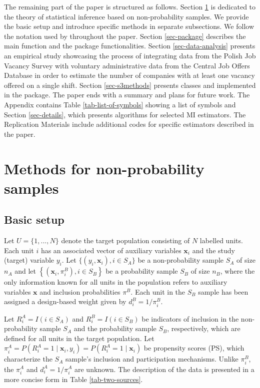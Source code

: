 \documentclass[
]{jss}
\begin{document}
The remaining part of the paper is structured as follows. Section
\ref{sec-methods} is dedicated to the theory of statistical inference
based on non-probability samples. We provide the basic setup and
introduce specific methods in separate subsections. We follow the
notation used by \citet{wu2022statistical} throughout the paper. Section
\ref{sec-package} describes the main function and the package
functionalities. Section \ref{sec-data-analysis} presents an empirical
study showcasing the process of integrating data from the Polish Job
Vacancy Survey with voluntary administrative data from the Central Job
Offers Database in order to estimate the number of companies with at
least one vacancy offered on a single shift. Section \ref{sec-s3methods}
presents classes and  implemented in the package. The
paper ends with a summary and plans for future work. The Appendix
contains Table \ref{tab-list-of-symbols} showing a list of symbols and
Section \ref{sec-details}, which presents algorithms for selected MI
estimators. The Replication Materials include additional codes for
specific estimators described in the paper.

\section{Methods for non-probability samples}\label{sec-methods}

\subsection{Basic setup}\label{basic-setup}

Let \(U=\{1,..., N\}\) denote the target population consisting of \(N\)
labelled units. Each unit \(i\) has an associated vector of auxiliary
variables \(\boldsymbol{x}_{i}\) and the study (target) variable
\(y_{i}\). Let \(\{ (y_i, \boldsymbol{x}_i), i \in S_A\}\) be a
non-probability sample \(S_A\) of size \(n_A\) and let
\(\left\{\left(\boldsymbol{x}_i, \pi_{i}^B\right), i \in S_B\right\}\)
be a probability sample \(S_B\) of size \(n_B\), where the only
information known for all units in the population refers to auxiliary
variables \(\boldsymbol{x}\) and inclusion probabilities \(\pi^B\). Each
unit in the \(S_B\) sample has been assigned a design-based weight given
by \(d_i^B = 1/\pi_i^B\).

Let \(R_i^A=I(i \in S_A)\) and \(R_i^B=I(i \in S_B)\) be indicators of
inclusion in the non-probability sample \(S_A\) and the probability
sample \(S_B\), respectively, which are defined for all units in the
target population. Let
\(\pi_i^A=P(R_i^A=1 \mid \boldsymbol{x}_i, y_i)=P(R_i^A=1 \mid \boldsymbol{x}_i)\)
be propensity scores (PS), which characterize the \(S_A\) sample's
inclusion and participation mechanisms. Unlike \(\pi_i^B\), the
\(\pi_i^A\) and \(d_i^A=1/\pi_i^A\) are unknown. The description of the
data is presented in a more concise form in Table \ref{tab-two-sources}.
\end{document}
